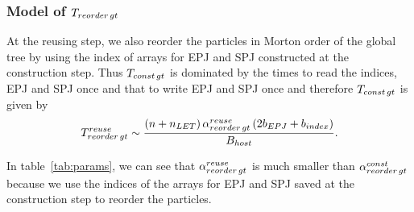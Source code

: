 \documentclass[dvipdfmx]{pasj01}
\begin{document}


\subsubsection{Model of $T_{\rm reorder\, gt}$}

At the reusing step, we also reorder the particles in Morton order of
the global tree by using the index of arrays for EPJ and SPJ
constructed at the construction step. Thus $T_{\rm const\, gt}$ is
dominated by the times to read the indices, EPJ and SPJ once and that
to write EPJ and SPJ once and therefore $T_{\rm const\, gt}$ is given
by
\begin{equation}
  T^{\rm reuse}_{\rm reorder\, gt} \sim \frac{\left(n+ n_{\rm LET}\right) \alpha^{\rm reuse}_{\rm reorder\, gt} \left( 2b_{\rm EPJ}+b_{\rm index} \right)}{B_{\rm host}}. \\ \label{eq:gt_sort_ptcl_reuse}  
\end{equation}


In table~\ref{tab:params}, we can see that $\alpha^{\rm reuse}_{\rm
  reorder\, gt}$ is much smaller than $\alpha^{\rm const}_{\rm
  reorder\, gt}$ because we use the indices of the arrays for EPJ and
SPJ saved at the construction step to reorder the particles.

\end{document}
